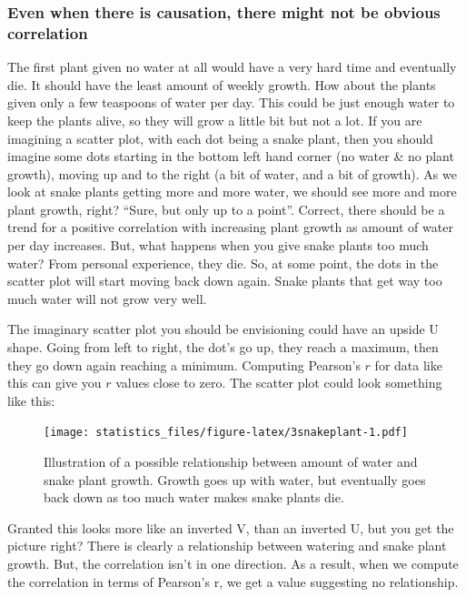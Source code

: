 \documentclass[]{book}
\begin{document}
\hypertarget{even-when-there-is-causation-there-might-not-be-obvious-correlation}{%
\subsubsection{Even when there is causation, there might not be obvious correlation}\label{even-when-there-is-causation-there-might-not-be-obvious-correlation}}

The first plant given no water at all would have a very hard time and eventually die. It should have the least amount of weekly growth. How about the plants given only a few teaspoons of water per day. This could be just enough water to keep the plants alive, so they will grow a little bit but not a lot. If you are imagining a scatter plot, with each dot being a snake plant, then you should imagine some dots starting in the bottom left hand corner (no water \& no plant growth), moving up and to the right (a bit of water, and a bit of growth). As we look at snake plants getting more and more water, we should see more and more plant growth, right? ``Sure, but only up to a point''. Correct, there should be a trend for a positive correlation with increasing plant growth as amount of water per day increases. But, what happens when you give snake plants too much water? From personal experience, they die. So, at some point, the dots in the scatter plot will start moving back down again. Snake plants that get way too much water will not grow very well.

The imaginary scatter plot you should be envisioning could have an upside U shape. Going from left to right, the dot's go up, they reach a maximum, then they go down again reaching a minimum. Computing Pearson's \(r\) for data like this can give you \(r\) values close to zero. The scatter plot could look something like this:

\begin{figure}
\centering
\texttt{[image: statistics\_files/figure-latex/3snakeplant-1.pdf]}
\caption{\label{fig:3snakeplant}Illustration of a possible relationship between amount of water and snake plant growth. Growth goes up with water, but eventually goes back down as too much water makes snake plants die.}
\end{figure}

Granted this looks more like an inverted V, than an inverted U, but you get the picture right? There is clearly a relationship between watering and snake plant growth. But, the correlation isn't in one direction. As a result, when we compute the correlation in terms of Pearson's r, we get a value suggesting no relationship.
\end{document}
